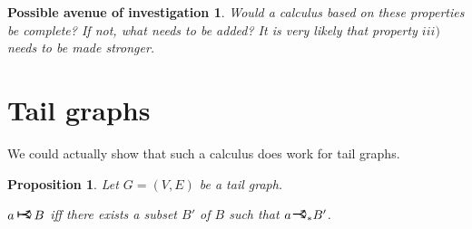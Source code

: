 \documentclass[11pt]{article}
\newcommand{\rightcurveor}{
\!
\mathrel{
  \begin{tikzpicture}[scale=0.8]
    \draw[thick,->] (0,0) arc (90:150:-2ex);
    \draw[thick,->] (0,0) arc (90:30:2ex);
    \draw[thick] (-1ex, 0) -- (0.1ex,0);
  \end{tikzpicture}
}\!
}
\newcommand{\Rightcurveor}{
\mathrel{
  \begin{tikzpicture}[scale=0.8]
    \draw[thick,->] (0,0) arc (90:150:-2ex);
    \draw[thick,->] (0,0) arc (90:30:2ex);
    \draw[thick] (-1ex, 0) -- (0.1ex,0);
    \draw[thick] (-1ex, -0.7ex) -- (-1ex, 0.7ex);
  \end{tikzpicture}
}
}
\newtheorem{prop}{Proposition}
\newtheorem*{av}{Possible avenue of investigation}
\begin{document}
\begin{av}
Would a calculus based on these properties be complete? If not, what needs to be added? It is very likely that property $iii)$ needs to be made stronger.
\end{av}

\section{Tail graphs}

We could actually show that such a calculus does work for tail graphs.

\begin{prop} \label{tailgraphindirectimplicationcharacterization}
Let $G = (V,E)$ be a tail graph.

$a \Rightcurveor B$ iff there exists a subset $B'$ of $B$ such that $a \rightcurveor_* B'$.
\end{prop}
\end{document}
